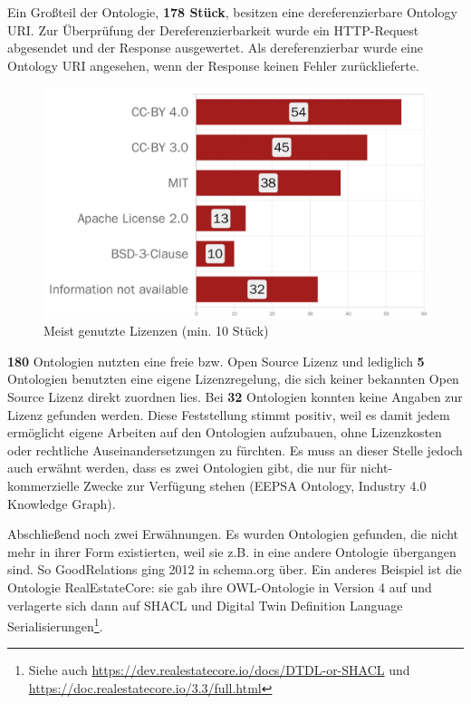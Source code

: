 \documentclass{article}
\begin{document}
Ein Großteil der Ontologie, \textbf{178 Stück}, besitzen eine dereferenzierbare Ontology URI.
Zur Überprüfung der Dereferenzierbarkeit wurde ein HTTP-Request abgesendet und der Response ausgewertet.
Als dereferenzierbar wurde eine Ontology URI angesehen, wenn der Response keinen Fehler zurücklieferte.

\begin{figure}[H]
    \includegraphics[scale=0.14]{bars-license-usage}
    \centering
    \caption{Meist genutzte Lizenzen (min. 10 Stück)}
\end{figure}

\textbf{180} Ontologien nutzten eine freie bzw. Open Source Lizenz und lediglich \textbf{5} Ontologien benutzten eine eigene Lizenzregelung, die sich keiner bekannten Open Source Lizenz direkt zuordnen lies.
Bei \textbf{32} Ontologien konnten keine Angaben zur Lizenz gefunden werden.
Diese Feststellung stimmt positiv, weil es damit jedem ermöglicht eigene Arbeiten auf den Ontologien aufzubauen, ohne Lizenzkosten oder rechtliche Auseinandersetzungen zu fürchten.
Es muss an dieser Stelle jedoch auch erwähnt werden, dass es zwei Ontologien gibt, die nur für nicht-kommerzielle Zwecke zur Verfügung stehen (EEPSA Ontology, Industry 4.0 Knowledge Graph).

Abschließend noch zwei Erwähnungen.
Es wurden Ontologien gefunden, die nicht mehr in ihrer Form existierten, weil sie z.B. in eine andere Ontologie übergangen sind. So GoodRelations ging 2012 in schema.org über. Ein anderes Beispiel ist die Ontologie RealEstateCore: sie gab ihre OWL-Ontologie in Version 4 auf und verlagerte sich dann auf SHACL und Digital Twin Definition Language Serialisierungen\footnote{Siehe auch \url{https://dev.realestatecore.io/docs/DTDL-or-SHACL} und \url{https://doc.realestatecore.io/3.3/full.html}}.
\end{document}
